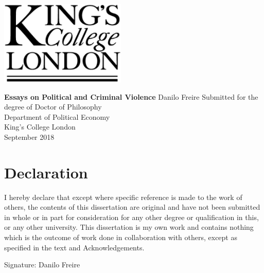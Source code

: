 \documentclass[a4paper,12pt]{report}
\begin{document}




\thispagestyle{empty}
\begin{center}
\includegraphics[width=6cm]{images/kcl.eps}
\end{center}	
\vskip40mm
\begin{center}
\huge\textbf{Essays on Political and Criminal Violence}
\vskip2mm
\vskip5mm
\Large Danilo Freire
\normalsize
\vfill
\large
Submitted for the degree of Doctor of Philosophy \\
Department of Political Economy \\
King's College London	\\
September 2018
\end{center}	


\chapter*{Declaration}
\noindent 
I hereby declare that except where specific reference is made to the work of others, the contents of this dissertation are original and have not been submitted in whole or in part for consideration for any other degree or qualification in this, or any other university. This dissertation is my own work and contains nothing which is the outcome of work done in collaboration with others, except as specified in the text and Acknowledgements. 


\vskip20mm
\noindent
Signature:
\vskip20mm
\noindent 
Danilo Freire


\end{document}
